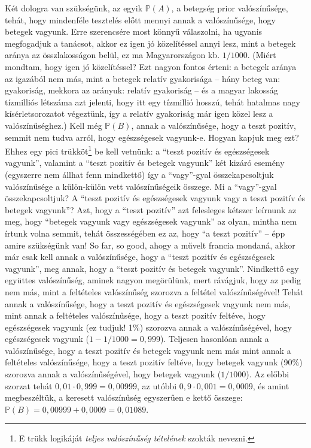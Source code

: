 \documentclass[magyar,]{book}
\let\rmarkdownfootnote\footnote%
\def\footnote{\protect\rmarkdownfootnote}
\begin{document}
Két dologra van szükségünk, az egyik \(\mathbb{P}\left(A\right)\), a betegség prior valószínűsége, tehát, hogy mindenféle tesztelés előtt mennyi annak a valószínűsége, hogy betegek vagyunk. Erre szerencsére most könnyű válaszolni, ha ugyanis megfogadjuk a tanácsot, akkor ez igen jó közelítéssel annyi lesz, mint a betegek aránya az összlakosságon belül, ez ma Magyarországon kb. \(1/1000\). (Miért mondtam, hogy igen jó közelítéssel? Ezt nagyon fontos érteni: a betegek aránya az igazából nem más, mint a betegek relatív gyakorisága -- hány beteg van: gyakoriság, mekkora az arányuk: relatív gyakoriság -- és a magyar lakosság tízmilliós létszáma azt jelenti, hogy itt egy tízmillió hosszú, tehát hatalmas nagy kísérletsorozatot végeztünk, így a relatív gyakoriság már igen közel lesz a valószínűséghez.) Kell még \(\mathbb{P}\left(B\right)\), annak a valószínűsége, hogy a teszt pozitív, semmit nem tudva arról, hogy egészségesek vagyunk-e. Hogyan kapjuk meg ezt? Ehhez egy pici trükköt\footnote{E trükk logikáját \emph{teljes valószínűség tételének} szokták nevezni.} be kell vetnünk: a \enquote{teszt pozitív és egészségesek vagyunk}, valamint a \enquote{teszt pozitív és betegek vagyunk} két kizáró esemény (egyszerre nem állhat fenn mindkettő) így a \enquote{vagy}-gyal összekapcsoltjuk valószínűsége a külön-külön vett valószínűségeik összege. Mi a \enquote{vagy}-gyal összekapcsoltjuk? A \enquote{teszt pozitív és egészségesek vagyunk vagy a teszt pozitív és betegek vagyunk}? Azt, hogy a \enquote{teszt pozitív} azt felesleges kétszer leírnunk az meg, hogy \enquote{betegek vagyunk vagy egészségesek vagyunk} az olyan, mintha nem írtunk volna semmit, tehát összességében ez az, hogy \enquote{a teszt pozitív} -- épp amire szükségünk van! So far, so good, ahogy a művelt francia mondaná, akkor már csak kell annak a valószínűsége, hogy a \enquote{teszt pozitív és egészségesek vagyunk}, meg annak, hogy a \enquote{teszt pozitív és betegek vagyunk}. Nindkettő egy együttes valószínűség, aminek nagyon megörülünk, mert rávágjuk, hogy az pedig nem más, mint a feltételes valószínűség szorozva a feltétel valószínűségével! Tehát annak a valószínűsége, hogy a teszt pozitív és egészségesek vagyunk nem más, mint annak a feltételes valószínűsége, hogy a teszt pozitív feltéve, hogy egészségesek vagyunk (ez tudjuk! 1\%) szorozva annak a valószínűségével, hogy egészségesek vagyunk (\(1-1/1000=0,\!999\)). Teljesen hasonlóan annak a valószínűsége, hogy a teszt pozitív és betegek vagyunk nem más mint annak a feltételes valószínűsége, hogy a teszt pozitív feltéve, hogy betegek vagyunk (90\%) szorozva annak a valószínűségével, hogy betegek vagyunk (\(1/1000\)). Az előbbi szorzat tehát \(0,\!01 \cdot 0,\!999=0,\!00999\), az utóbbi \(0,\!9 \cdot 0,\!001=0,\!0009\), és amint megbeszéltük, a keresett valószínűség egyszerűen e kettő összege: \(\mathbb{P}\left(B\right)=0,\!00999+0,\!0009=0,\!01089\).
\end{document}
